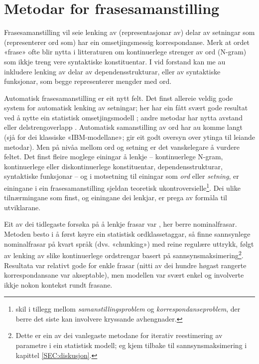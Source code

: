 \documentclass[12pt,a4paper,oneside,draft]{report}
\begin{document}
\section{Metodar for frasesamanstilling}
\label{sec-2.1}

Frasesamanstilling vil seie lenking av (representasjonar av) delar av
 setningar som (representerer ord som) har ein omsetjingsmessig
 korrespondanse. Merk at ordet «frase» ofte blir nytta i litteraturen
 om kontinuerlege strenger av ord (N-gram) som ikkje treng vere
 syntaktiske konstituentar. I vid forstand kan me au inkludere
 lenking av delar av dependensstrukturar, eller av syntaktiske
 funksjonar, som begge representerer mengder med ord.

Automatisk frasesamanstilling er eit nytt felt.  Det finst allereie
 veldig gode system for automatisk lenking av setningar; her har ein
 fått svært gode resultat ved å nytte ein statistisk omsetjingsmodell
 \citep{chen1993asb}; andre metodar har nytta avstand eller
 delstrengoverlapp
 \citep[s.~467--484~gir~eit~oversyn]{manning99foundations}.
 Automatisk samanstilling av ord har au komme langt (sjå
 \citet{brown1993msm} for dei klassiske «IBM-modellane»;
 \citet{och2003scv} gir eit godt oversyn over ytinga til leiande
 metodar).  Men på nivåa mellom ord og setning er det vanskelegare å
 vurdere feltet.  Det finst fleire moglege einingar å lenkje --
 kontinuerlege N-gram, kontinuerlege eller diskontinuerlege
 konstituentar, dependensstrukturar, syntaktiske funksjonar -- og i
 motsetning til einingar som \emph{ord} eller \emph{setning}, er einingane i ein
 frasesamanstilling sjeldan teoretisk ukontroversielle\footnote{\citet[s.~470]{manning99foundations} skil i tillegg mellom
        \emph{samanstillingsproblem} og \emph{korrespondanseproblem}, der berre
        det siste kan involvere kryssande avhengnader. }.  Dei
 ulike tilnærmingane som finst, og einingane dei lenkjar, er prega av
 formåla til utviklarane.

Eit av dei tidlegaste forsøka på å lenkje frasar var
 \citet{kupiec1993afn}, her berre nominalfrasar. Metoden besto i å
 først køyre ein statistisk ordklassetaggar, så finne sannsynlege
 nominalfrasar på kvart språk (dvs. «chunking») med reine regulære
 uttrykk, følgt av lenking av slike kontinuerlege ordstrengar basert
 på sannsynsmaksimering\footnote{Dette er ein av dei vanlegaste metodane for iterativ
        reestimering av parametre i ein statistisk modell; eg kjem
        tilbake til sannsynsmaksimering i kapittel
        \ref{SEC:diskusjon}. }. Resultata var relativt gode for enkle
 frasar (nitti av dei hundre høgast rangerte korrespondansane var
 akseptable), men modellen var svært enkel og involverte ikkje nokon
 kontekst rundt frasane.
\end{document}
